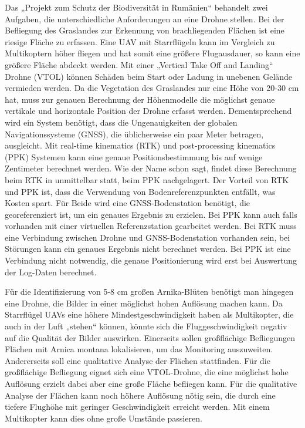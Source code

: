 Das „Projekt zum Schutz der Biodiversität in Rumänien“ behandelt zwei Aufgaben, die unterschiedliche Anforderungen an eine Drohne stellen. Bei der Befliegung des Graslandes zur Erkennung von brachliegenden Flächen ist eine riesige Fläche zu erfassen. Eine UAV mit Starrflügeln kann im Vergleich zu Multikoptern höher fliegen und hat somit eine größere Flugausdauer, so kann eine größere Fläche abdeckt werden. Mit einer „Vertical Take Off and Landing“ Drohne (VTOL) können Schäden beim Start oder Ladung in unebenen Gelände vermieden werden. Da die Vegetation des Graslandes nur eine Höhe von 20-30 cm hat, muss zur genauen Berechnung der Höhenmodelle die möglichst genaue vertikale und horizontale Position der Drohne erfasst werden. Dementsprechend wird ein System  benötigt, dass die Ungenauigkeiten der globalen Navigationssysteme (GNSS), die üblicherweise ein paar Meter betragen, ausgleicht. Mit real-time kinematics (RTK) und post-processing kinematics (PPK) Systemen kann eine genaue Positionsbestimmung bis auf wenige Zentimeter berechnet werden. Wie der Name schon sagt, findet diese Berechnung beim RTK in unmittelbar statt, beim PPK nachgelagert. 
Der Vorteil von RTK und PPK ist, dass die Verwendung von Bodenreferenzpunkten entfällt, was Kosten spart. Für Beide wird eine GNSS-Bodenstation benötigt, die georeferenziert ist, um ein genaues Ergebnis zu erzielen. Bei PPK kann auch falls vorhanden mit einer virtuellen Referenzstation gearbeitet werden. Bei RTK muss eine Verbindung zwischen Drohne und GNSS-Bodenstation vorhanden sein, bei Störungen kann ein genaues Ergebnis nicht berechnet werden. Bei PPK ist eine Verbindung nicht notwendig, die genaue Positionierung wird erst bei Auswertung der Log-Daten berechnet. 

Für die Identifizierung von 5-8 cm großen Arnika-Blüten benötigt man hingegen eine Drohne, die Bilder in einer möglichst hohen Auflösung machen kann. Da Starrflügel UAVs eine höhere Mindestgeschwindigkeit haben als Multikopter, die auch in der Luft „stehen“ können, könnte sich die Fluggeschwindigkeit negativ auf die Qualität der Bilder auswirken. Einerseits sollen großflächige Befliegungen Flächen mit Arnica montana lokalisieren, um das Monitoring auszuweiten. Andererseits soll eine qualitative Analyse der Flächen stattfinden. Für die großflächige Befliegung eignet sich eine VTOL-Drohne, die eine möglichst hohe Auflösung erzielt dabei aber eine große Fläche befliegen kann. Für die qualitative Analyse der Flächen kann noch höhere Auflösung nötig sein, die durch eine tiefere Flughöhe mit geringer Geschwindigkeit erreicht werden. Mit einem Multikopter kann dies ohne große Umstände passieren.

